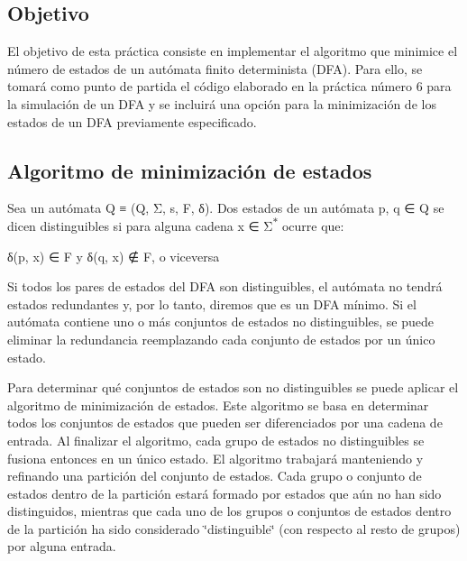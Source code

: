 \subsection*{Objetivo}

El objetivo de esta práctica consiste en implementar el algoritmo que minimice el número de estados de un autómata finito determinista (D\+FA). Para ello, se tomará como punto de partida el código elaborado en la práctica número 6 para la simulación de un D\+FA y se incluirá una opción para la minimización de los estados de un D\+FA previamente especificado.

\subsection*{Algoritmo de minimización de estados}

Sea un autómata Q ≡ (Q, Σ, s, F, δ). Dos estados de un autómata p, q ∈ Q se dicen distinguibles si para alguna cadena x ∈ Σ\textsuperscript{$\ast$} ocurre que\+:

δ(p, x) ∈ F y δ(q, x) ∉ F, o viceversa

Si todos los pares de estados del D\+FA son distinguibles, el autómata no tendrá estados redundantes y, por lo tanto, diremos que es un D\+FA mínimo. Si el autómata contiene uno o más conjuntos de estados no distinguibles, se puede eliminar la redundancia reemplazando cada conjunto de estados por un único estado.

Para determinar qué conjuntos de estados son no distinguibles se puede aplicar el algoritmo de minimización de estados. Este algoritmo se basa en determinar todos los conjuntos de estados que pueden ser diferenciados por una cadena de entrada. Al finalizar el algoritmo, cada grupo de estados no distinguibles se fusiona entonces en un único estado. El algoritmo trabajará manteniendo y refinando una partición del conjunto de estados. Cada grupo o conjunto de estados dentro de la partición estará formado por estados que aún no han sido distinguidos, mientras que cada uno de los grupos o conjuntos de estados dentro de la partición ha sido considerado \char`\"{}distinguible\char`\"{} (con respecto al resto de grupos) por alguna entrada.

